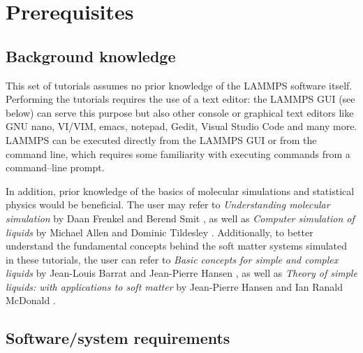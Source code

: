 \documentclass[9pt,tutorial]{livecoms}
\begin{document}

\section{Prerequisites}


\subsection{Background knowledge}

This set of tutorials assumes no prior knowledge of the LAMMPS software itself. Performing the tutorials requires the use of a text editor: the LAMMPS GUI (see below) can serve this purpose but also other console or graphical text editors like GNU nano, VI/VIM, emacs, notepad, Gedit, Visual Studio Code and many more.  LAMMPS can be executed directly from the LAMMPS GUI or from the command line, which requires some familiarity with executing commands from a command--line prompt.

In addition, prior knowledge of the basics of molecular simulations and statistical physics would be beneficial. The user may refer to \textit{Understanding molecular simulation} by Daan Frenkel and Berend Smit \cite{frenkel2023understanding}, as well as \textit{Computer simulation of liquids} by Michael Allen and Dominic Tildesley \cite{allen2017computer}. Additionally, to better understand the fundamental concepts behind the soft matter systems simulated in these tutorials, the user can refer to \textit{Basic concepts for simple and complex liquids} by Jean-Louis Barrat and Jean-Pierre Hansen \cite{barrat2003basic}, as well as \textit{Theory of simple liquids: with applications to soft matter} by Jean-Pierre Hansen and Ian Ranald McDonald \cite{hansen2013theory}.

\subsection{Software/system requirements}
\end{document}
